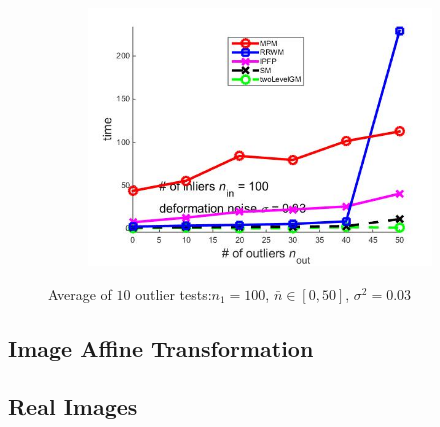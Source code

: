 \documentclass[
	fontsize=12pt,
	paper=a4,
	twoside=false,
	numbers=noenddot,
	plainheadsepline,
	toc=listof,
	toc=bibliography
]{scrartcl}
\begin{document}
\begin{figure}[ht]
\begin{subfigure}[b]{0.3\textwidth}
		\includegraphics[scale=0.25]{"fig_ver2108/syntheticPointSets/outliertest_n50/time_avg10tests"} 
	\end{subfigure} 	
	\caption{ Average of $10$ outlier tests:$n_1=100$, $\bar{n}\in[0,50]$, $\sigma^2=0.03$}
\end{figure}

\subsection{Image Affine Transformation}


\subsection{Real Images}


	
\end{document}
